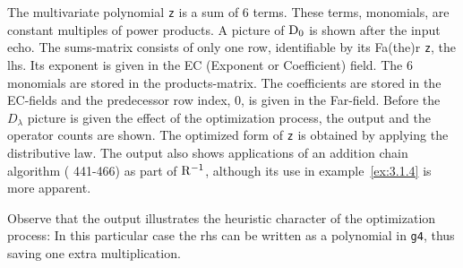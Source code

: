 The multivariate polynomial {\tt z} is a sum of 6 terms. These
terms, monomials, are constant multiples of power products.  A
picture of ${{\rm D}}_{0}$ is shown after the input echo. The
sums-matrix consists of only one row, identifiable by its Fa(the)r {\tt z},
the lhs. Its exponent is given in the EC (Exponent or Coefficient)
field. The 6 monomials are stored in the products-matrix. The
coefficients are stored in the EC-fields and the predecessor row
index, 0, is given in the Far-field. Before the $D_{\lambda}$ picture
is given the effect of the optimization process, the output and the
operator counts are shown. The optimized form of {\tt z} is obtained by
applying the distributive law. The output also shows applications of
an addition chain algorithm (\cite{Knuth:80} 441-466) as part of ${{\rm
R}}^{{-1}}$, although its use in example~\ref{ex:3.1.4} is more apparent.

Observe that the output illustrates the heuristic character of the
optimization process: In this particular case the rhs can be written
as a polynomial in {\tt g4}, thus saving one extra multiplication.

